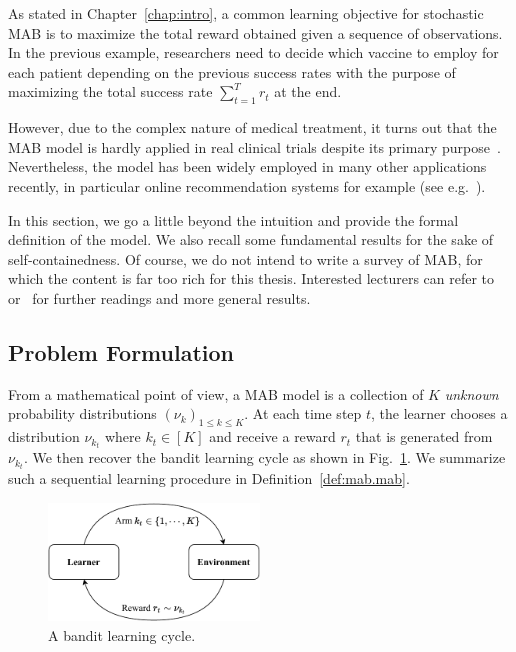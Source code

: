 As stated in Chapter~\ref{chap:intro}, a common learning objective for stochastic MAB is to maximize the total reward obtained given a sequence of observations. In the previous example, researchers need to decide which vaccine to employ for each patient depending on the previous success rates with the purpose of maximizing the total success rate $\sum_{t=1}^T r_t$ at the end.

However, due to the complex nature of medical treatment, it turns out that the MAB model is hardly applied in real clinical trials despite its primary purpose~\citep{reda2020drug}. Nevertheless, the model has been widely employed in many other applications recently, in particular online recommendation systems for example (see e.g.~\citealt{li2010contextual,zeng2016online}).

In this section, we go a little beyond the intuition and provide the formal definition of the model. We also recall some fundamental results for the sake of self-containedness. Of course, we do not intend to write a survey of MAB, for which the content is far too rich for this thesis. Interested lecturers can refer to~\cite{bubeck2012bandits,lattimore2018bandits} or~\cite{slivkins2019bandits} for further readings and more general results.

\subsection{Problem Formulation}\label{sec:mab.model.formulation}

From a mathematical point of view, a MAB model is a collection of $K$ \emph{unknown} probability distributions $(\nu_k)_{1 \leq k \leq K}$. At each time step $t$, the learner chooses a distribution $\nu_{k_t}$ where $k_t\in[K]$ and receive a reward $r_t$ that is generated from $\nu_{k_t}$. We then recover the bandit learning cycle as shown in Fig.~\ref{fig:mab.mab}. We summarize such a sequential learning procedure in Definition~\ref{def:mab.mab}.

\begin{figure}[ht]
    \centering
    \includegraphics[width=0.5\textwidth]{Chapter2/img/mab_bis.pdf}
    \caption{A bandit learning cycle.}
    \label{fig:mab.mab}
\end{figure}

